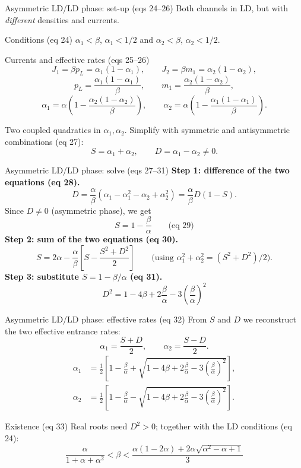 \documentclass[aspectratio=169,10pt]{beamer}
\begin{document}
\begin{frame}{Asymmetric LD/LD phase: set-up (eqs 24--26)}
  \small
  Both channels in LD, but with \emph{different} densities and currents.
  \begin{block}{Conditions (eq 24)}
    $\alpha_1 < \beta$, $\alpha_1 < 1/2$ and $\alpha_2 < \beta$, $\alpha_2 < 1/2$.
  \end{block}
  \begin{block}{Currents and effective rates (eqs 25--26)}
    \[
      J_1 = \beta p_L = \alpha_1(1-\alpha_1), \qquad
      J_2 = \beta m_1 = \alpha_2(1-\alpha_2),
    \]
    \[
      p_L = \frac{\alpha_1(1-\alpha_1)}{\beta}, \qquad
      m_1 = \frac{\alpha_2(1-\alpha_2)}{\beta},
    \]
    \[
      \alpha_1 = \alpha\left(1 - \frac{\alpha_2(1-\alpha_2)}{\beta}\right), \qquad
      \alpha_2 = \alpha\left(1 - \frac{\alpha_1(1-\alpha_1)}{\beta}\right).
    \]
  \end{block}
  Two coupled quadratics in $\alpha_1, \alpha_2$. Simplify with symmetric and
  antisymmetric combinations (eq 27):
  \[
    S = \alpha_1 + \alpha_2, \qquad D = \alpha_1 - \alpha_2 \neq 0.
  \]
\end{frame}

\begin{frame}{Asymmetric LD/LD phase: solve (eqs 27--31)}
  \footnotesize
  \textbf{Step 1: difference of the two equations (eq 28).}
  \[
    D = \frac{\alpha}{\beta}\left(\alpha_1 - \alpha_1^2 - \alpha_2 + \alpha_2^2\right)
    = \frac{\alpha}{\beta} D (1 - S).
  \]
  Since $D \neq 0$ (asymmetric phase), we get
  \[
    S = 1 - \frac{\beta}{\alpha} \qquad \text{(eq 29)}
  \]
  \textbf{Step 2: sum of the two equations (eq 30).}
  \[
    S = 2\alpha - \frac{\alpha}{\beta}\left[S - \frac{S^2 + D^2}{2}\right]
    \qquad\text{(using $\alpha_1^2 + \alpha_2^2 = (S^2+D^2)/2$).}
  \]
  \textbf{Step 3: substitute $S = 1 - \beta/\alpha$ (eq 31).}
  \[
    D^2 = 1 - 4\beta + 2\frac{\beta}{\alpha} - 3\left(\frac{\beta}{\alpha}\right)^2
  \]
\end{frame}

\begin{frame}{Asymmetric LD/LD phase: effective rates (eq 32)}
  \scriptsize
  From $S$ and $D$ we reconstruct the two effective entrance rates:
  \[
    \alpha_1 = \frac{S + D}{2}, \qquad \alpha_2 = \frac{S - D}{2}.
  \]
  \begin{align*}
    \alpha_1 &= \frac{1}{2}\left[1 - \frac{\beta}{\alpha} + \sqrt{1 - 4\beta + 2\frac{\beta}{\alpha} - 3\left(\frac{\beta}{\alpha}\right)^2}\right], \\[0.4em]
    \alpha_2 &= \frac{1}{2}\left[1 - \frac{\beta}{\alpha} - \sqrt{1 - 4\beta + 2\frac{\beta}{\alpha} - 3\left(\frac{\beta}{\alpha}\right)^2}\right].
  \end{align*}
  \begin{block}{Existence (eq 33)}
    Real roots need $D^2 > 0$; together with the LD conditions (eq 24):
    \[
      \frac{\alpha}{1 + \alpha + \alpha^2} < \beta <
        \frac{\alpha(1-2\alpha) + 2\alpha\sqrt{\alpha^2 - \alpha + 1}}{3}
    \]
  \end{block}
\end{frame}
\end{document}
